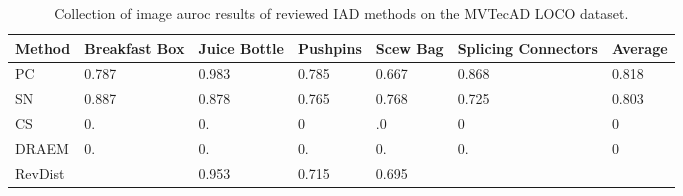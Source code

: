 \begin{table}[htbp]
    \tiny
    \centering
    \begin{tabularx}{\textwidth}{|X|X|X|X|X|X|X|}%
        \hline
        \textbf{Method} & \textbf{Breakfast Box} & \textbf{Juice Bottle} & \textbf{Pushpins} & \textbf{Scew Bag} & \textbf{Splicing Connectors} & \textbf{Average} \\
        \hline
        PC \cite{patchCore2022} & 0.787 & 0.983 & 0.785 & 0.667 & 0.868 & 0.818 \\
        \hline
        SN \cite{liu2023simplenet} & 0.887 & 0.878 & 0.765 & 0.768 & 0.725 & 0.803 \\
        \hline  %
        CS \cite{csflow2022} & 0. & 0. & 0 & .0 & 0 & 0 \\
        \hline
        DRAEM \cite{Zavrtanik_2021DRAEM} & 0. & 0. & 0. & 0. & 0. & 0 \\
        \hline
        RevDist \cite{revdist2023} &  & 0.953 & 0.715 & 0.695 &  &  \\
        \hline
    \end{tabularx}
    \caption{Collection of image auroc results of reviewed IAD methods on the MVTecAD LOCO \cite{LOCODentsAndScratchesBergmann2022} dataset.}
    \label{tab:imageaurocloco}
\end{table}





